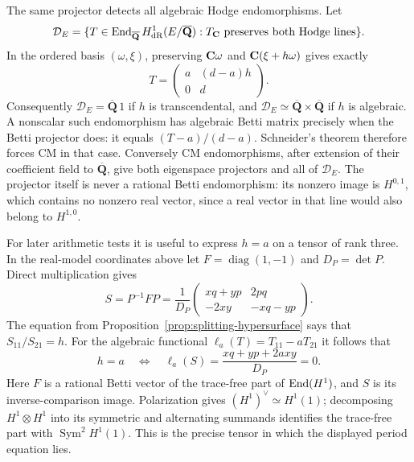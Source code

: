 \documentclass[11pt]{article}
\theoremstyle{definition}\newtheorem{definition}[theorem]{Definition}
\theoremstyle{remark}\newtheorem{remark}[theorem]{Remark}
\newcommand{\Qb}{\overline{\mathbf Q}}\newcommand{\Fp}{\mathbf F_p}
\begin{document}
The same projector detects all algebraic Hodge endomorphisms. Let
\[
 \mathcal D_E=\{T\in\End_{\Qb}H^1_{\dR}(E/\Qb):
                    T_{\C}\text{ preserves both Hodge lines}\}.
\]
In the ordered basis $(\omega,\xi)$, preserving $\mathbf C\omega$ and
$\mathbf C(\xi+h\omega)$ gives exactly
\[
 T=\begin{pmatrix}a&(d-a)h\\0&d\end{pmatrix}.
\]
Consequently $\mathcal D_E=\Qb\,1$ if $h$ is transcendental, and
$\mathcal D_E\simeq\Qb\times\Qb$ if $h$ is algebraic. A nonscalar such endomorphism has algebraic Betti matrix precisely when the Betti projector does: it equals $(T-a)/(d-a)$. Schneider's theorem therefore forces CM in that case. Conversely CM endomorphisms, after extension of their coefficient field to $\Qb$, give both eigenspace projectors and all of $\mathcal D_E$. The projector itself is never a rational Betti endomorphism: its nonzero image is $H^{0,1}$, which contains no nonzero real vector, since a real vector in that line would also belong to $H^{1,0}$.

For later arithmetic tests it is useful to express $h=a$ on a tensor of rank three. In the real-model coordinates above let $F=\operatorname{diag}(1,-1)$ and $D_P=\det P$. Direct multiplication gives
\[
 S=P^{-1}FP=\frac1{D_P}
 \begin{pmatrix}xq+yp&2pq\\-2xy&-xq-yp\end{pmatrix}.
\]
The equation from Proposition~\ref{prop:splitting-hypersurface} says that
$S_{11}/S_{21}=h$. For the algebraic functional
$\ell_a(T)=T_{11}-aT_{21}$ it follows that
\[
 h=a\quad\Longleftrightarrow\quad
 \ell_a(S)=\frac{xq+yp+2axy}{D_P}=0.
\]
Here $F$ is a rational Betti vector of the trace-free part of $\operatorname{End}(H^1)$, and $S$ is its inverse-comparison image. Polarization gives $(H^1)^\vee\simeq H^1(1)$; decomposing $H^1\otimes H^1$ into its symmetric and alternating summands identifies the trace-free part with $\operatorname{Sym}^2H^1(1)$. This is the precise tensor in which the displayed period equation lies.
\end{document}
